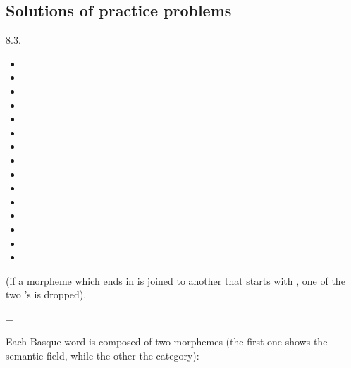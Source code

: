 \begin{refsection}
{\section{Solutions of practice problems}}

\begin{practiceproblemsolution}{8.3. \langnameBasque}

\begin{solutions}[label=Solution 8.3\alph*]
    \item
    \begin{itemize}
        \item[] 
        \item[] 
        \item[] 
        \item[] 
        \item[] 
        \item[] 
        \item[] 
        \item[] 
        \item[] 
        \item[] 
        \item[] 
        \item[] 
        \item[] 
        \item[] 
        \item[] 
    \end{itemize}
    \item {} (if a morpheme which ends in  is joined to another that starts with , one of the two 's is dropped).
    \item {} = 
\end{solutions}


 Each Basque word is composed of two morphemes (the first one shows the semantic field, while the other the category):


\end{practiceproblemsolution}
\end{refsection}
